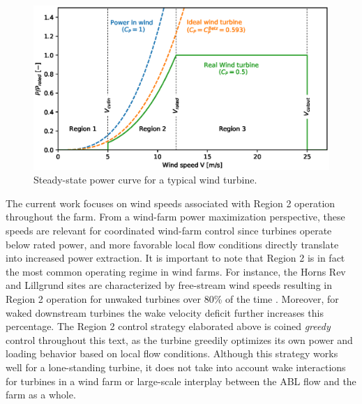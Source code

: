 \begin{figure}[t]
	\centering
	\includegraphics[width=\textwidth]{chapters/introduction/regions.eps}
	\caption{Steady-state power curve for a typical wind turbine. \label{fig:regions}}
\end{figure}

The current work focuses on wind speeds associated with Region 2 operation throughout the farm. From a wind-farm power maximization perspective, these speeds are relevant for coordinated wind-farm control since turbines operate below rated power, and more favorable local flow conditions directly translate into increased power extraction. It is important to note that Region 2 is in fact the most common operating regime in wind farms. For instance, the Horns Rev and Lillgrund sites are characterized by free-stream wind speeds resulting in Region 2 operation for unwaked turbines over 80\% of the time \citep{bergstrom, Gryning2016}. Moreover, for waked downstream turbines the wake velocity deficit further increases this percentage. 
The Region 2 control strategy elaborated above is coined \emph{greedy} control throughout this text, as the turbine greedily optimizes its own power and loading behavior based on local flow conditions. Although this strategy works well for a lone-standing turbine, it does not take into account wake interactions for turbines in a wind farm or large-scale interplay between the ABL flow and the farm as a whole.  





